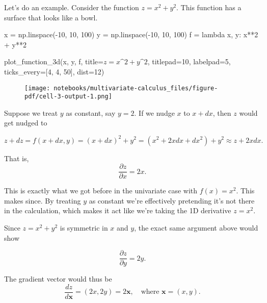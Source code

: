 \documentclass[
  letterpaper,
  DIV=11,
  numbers=noendperiod]{scrreprt}
\newenvironment{Shaded}{\begin{snugshade}}{\end{snugshade}}
\newcommand{\DecValTok}[1]{\textcolor[rgb]{0.68,0.00,0.00}{#1}}
\newcommand{\KeywordTok}[1]{\textcolor[rgb]{0.00,0.23,0.31}{#1}}
\newcommand{\NormalTok}[1]{\textcolor[rgb]{0.00,0.23,0.31}{#1}}
\newcommand{\OperatorTok}[1]{\textcolor[rgb]{0.37,0.37,0.37}{#1}}
\newcommand{\StringTok}[1]{\textcolor[rgb]{0.13,0.47,0.30}{#1}}
\begin{document}
Let's do an example. Consider the function \(z=x^2+y^2\). This function
has a surface that looks like a bowl.

\begin{Shaded}
\begin{Highlighting}[]
\NormalTok{x }\OperatorTok{=}\NormalTok{ np.linspace(}\OperatorTok{{-}}\DecValTok{10}\NormalTok{, }\DecValTok{10}\NormalTok{, }\DecValTok{100}\NormalTok{)}
\NormalTok{y }\OperatorTok{=}\NormalTok{ np.linspace(}\OperatorTok{{-}}\DecValTok{10}\NormalTok{, }\DecValTok{10}\NormalTok{, }\DecValTok{100}\NormalTok{)}
\NormalTok{f }\OperatorTok{=} \KeywordTok{lambda}\NormalTok{ x, y: x}\OperatorTok{**}\DecValTok{2} \OperatorTok{+}\NormalTok{ y}\OperatorTok{**}\DecValTok{2}

\NormalTok{plot\_function\_3d(x, y, f, title}\OperatorTok{=}\StringTok{\textquotesingle{}$z=x\^{}2+y\^{}2$\textquotesingle{}}\NormalTok{, titlepad}\OperatorTok{=}\DecValTok{10}\NormalTok{, labelpad}\OperatorTok{=}\DecValTok{5}\NormalTok{, ticks\_every}\OperatorTok{=}\NormalTok{[}\DecValTok{4}\NormalTok{, }\DecValTok{4}\NormalTok{, }\DecValTok{50}\NormalTok{], dist}\OperatorTok{=}\DecValTok{12}\NormalTok{)}
\end{Highlighting}
\end{Shaded}

\begin{figure}[H]

{\centering \texttt{[image: notebooks/multivariate-calculus\_files/figure-pdf/cell-3-output-1.png]}

}

\end{figure}

Suppose we treat \(y\) as constant, say \(y=2\). If we nudge \(x\) to
\(x+dx\), then \(z\) would get nudged to

\[z+dz = f(x+dx,y) = (x+dx)^2 + y^2 = (x^2 + 2xdx + dx^2) + y^2 \approx z + 2xdx.\]

That is, \[\frac{\partial z}{\partial x} = 2x.\]

This is exactly what we got before in the univariate case with
\(f(x)=x^2\). This makes since. By treating \(y\) as constant we're
effectively pretending it's not there in the calculation, which makes it
act like we're taking the 1D derivative \(z=x^2\).

Since \(z=x^2+y^2\) is symmetric in \(x\) and \(y\), the exact same
argument above would show

\[\frac{\partial z}{\partial y} = 2y.\]

The gradient vector would thus be
\[\frac{dz}{d\mathbf{x}} = (2x, 2y) = 2\mathbf{x}, \quad \text{where }\mathbf{x} = (x,y).\]
\end{document}

